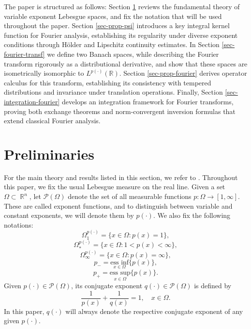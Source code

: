 \documentclass[11pt,reqno]{amsart}
\theoremstyle{definition}
\theoremstyle{definition}
\theoremstyle{definition}
\DeclareMathOperator{\R}{\mathbb{R}}
\newcommand{\p}{p(\cdot)}
\newcommand{\q}{q(\cdot)}
\begin{document}
The paper is structured as follows: Section \ref{section_preliminaries} reviews the fundamental theory of variable exponent Lebesgue spaces,  and fix the notation that will be used throughout the paper. Section \ref{sec-prop-psi} introduces a key integral kernel function for Fourier analysis, establishing its regularity under diverse exponent conditions through Hölder and Lipschitz continuity estimates. In Section \ref{sec-fourier-transf} we define two Banach spaces, while describing the Fourier transform rigorously as a distributional derivative, and show that these spaces are isometrically isomorphic to $L^{\p}(\mathbb{R})$. Section \ref{sec-prop-fourier} derives operator calculus for this transform, establishing its consistency with tempered distributions and invariance under translation operations. Finally, Section \ref{sec-integration-fourier} develops an integration framework for Fourier transforms, proving both exchange theorems and norm-convergent inversion formulas that extend classical Fourier analysis.

\section{Preliminaries}\label{section_preliminaries}

    For the main theory and results listed in this section, we refer to \cite{Cruz-Uribe}. Throughout this paper, we fix the usual Lebesgue measure on the real line.   Given a set $\Omega\subset \R^n$, let $\mathcal{P}(\Omega)$ denote the set of all measurable functions $p:\Omega\to[1,\infty]$. These are called exponent functions, and to distinguish between variable and constant exponents, we will denote them by $\p$. We also fix the following notations:
    \begin{equation*}
        \Omega_1^{\p}=\{x\in\Omega : p(x)=1\},
        \end{equation*}
        \begin{equation*}
                    \Omega_*^{\p}=\{x\in\Omega : 1<p(x)<\infty\},
        \end{equation*}
\begin{equation*}
        \Omega_\infty^{\p}=\{x\in\Omega : p(x)=\infty\},
    \end{equation*}
        \begin{equation*}
        p_{-}=\underset{{x\in \Omega}}{\text{ess inf}}\{p(x)\},
    \end{equation*}
    \begin{equation*}
        p_{+}=\underset{{x\in \Omega}}{\text{ess sup}}\{p(x)\}.
    \end{equation*}
    Given $\p\in\mathcal{P}(\Omega)$, its conjugate exponent $\q\in\mathcal{P}(\Omega)$ is defined by 
    \begin{equation*}
        \frac{1}{p(x)}+\frac{1}{q(x)}=1,\quad x\in\Omega.
    \end{equation*}
    In this paper, $\q$ will always denote the respective  conjugate exponent of any given $\p$.
\end{document}
